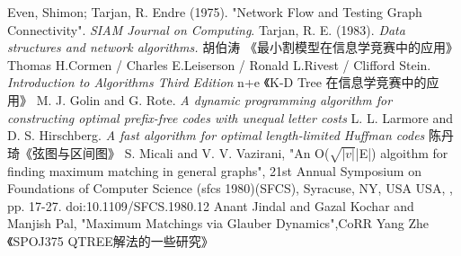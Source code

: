 \begin{thebibliography}{999}
	 Even, Shimon; Tarjan, R. Endre (1975).
	"Network Flow and Testing Graph Connectivity".
    \emph{SIAM Journal on Computing}.
     Tarjan, R. E. (1983).
    \emph{Data structures and network algorithms.}
    胡伯涛 《最小割模型在信息学竞赛中的应用》
      Thomas H.Cormen / Charles E.Leiserson /
     Ronald L.Rivest / Clifford Stein.
     \emph{Introduction to Algorithms Third Edition}
    n+e 《K-D Tree 在信息学竞赛中的应用》
    M. J. Golin and G. Rote.
    \emph{A dynamic programming algorithm for constructing optimal
    prefix-free codes with unequal letter costs}
    L. L. Larmore and D. S. Hirschberg.
    \emph{A fast algorithm for optimal length-limited Huffman codes}
     陈丹琦《弦图与区间图》
    S. Micali and V. V. Vazirani,
    "An O($\sqrt{|v|}$|E|) algoithm for finding maximum matching
    in general graphs",
     21st Annual Symposium on Foundations of Computer Science (sfcs 1980)(SFCS),
     Syracuse, NY, USA USA, , pp. 17-27.
    doi:10.1109/SFCS.1980.12
     Anant Jindal and Gazal Kochar and Manjish Pal,
    "Maximum Matchings via Glauber Dynamics",CoRR
     Yang Zhe 《SPOJ375 QTREE解法的一些研究》
\end{thebibliography}
